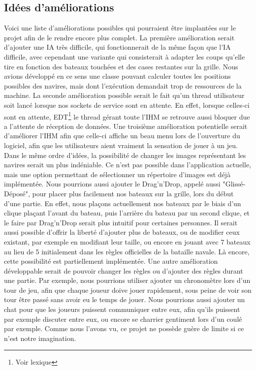 \subsection{Idées d'améliorations}
	Voici une liste d'améliorations possibles qui pourraient être implantées sur le projet afin de le rendre encore plus complet.\newline
	La première amélioration serait d'ajouter une IA très difficile, qui fonctionnerait de la même façon que l'IA difficile, avec cependant une variante qui consisterait à adapter les coups qu'elle tire en fonction des bateaux touchées et des cases restantes sur la grille. Nous avions développé en ce sens une classe pouvant calculer toutes les positions possibles des navires, mais dont l'exécution demandait trop de ressources de la machine.\newline
	La seconde amélioration possible serait le fait qu'un thread utilisateur soit lancé lorsque nos sockets de service sont en attente. En effet, lorsque celles-ci sont en attente, EDT\footnote{Voir lexique} le thread gérant toute l'IHM se retrouve aussi bloquer due a l'attente de réception de données.\newline
	Une troisième amélioration potentielle serait d'améliorer l'IHM afin que celle-ci affiche un beau menu lors de l'ouverture du logiciel, afin que les utilisateurs aient vraiment la sensation de jouer à un jeu.\newline
	Dans le même ordre d'idées, la possibilité de changer les images représentant les navires serait un plus indéniable. Ce n'est pas possible dans l'application actuelle, mais une option permettant de sélectionner un répertoire d'images est déjà implémentée.\newline
	Nous pourrions aussi ajouter le Drag'n'Drop, appelé aussi "Glissé-Déposé", pour placer plus facilement nos bateaux sur la grille, lors du début d'une partie. En effet, nous plaçons actuellement nos bateaux par le biais d'un clique plaçant l'avant du bateau, puis l'arrière du bateau par un second clique, et le faire par Drag'n'Drop serait plus intuitif pour certaines personnes.\newline
	Il serait aussi possible d'offrir la liberté d'ajouter plus de bateaux, ou de modifier ceux existant, par exemple en modifiant leur taille, ou encore en jouant avec 7 bateaux au lieu de 5 initialement dans les règles officielles de la bataille navale. Là encore, cette possibilité est partiellement implémentée.\newline
	Une autre amélioration développable serait de pouvoir changer les règles ou d'ajouter des règles durant une partie. Par exemple, nous pourrions utiliser ajouter un chronomètre lors d'un tour de jeu, afin que chaque joueur doive jouer rapidement, sous peine de voir son tour être passé sans avoir eu le temps de jouer.
	Nous pourrions aussi ajouter un chat pour que les joueurs puissent communiquer entre eux, afin qu'ils puissent par exemple discuter entre eux, ou encore se charrier gentiment lors d'un coulé par exemple.\newline
	Comme nous l'avons vu, ce projet ne possède guère de limite si ce n'est notre imagination.\newline

